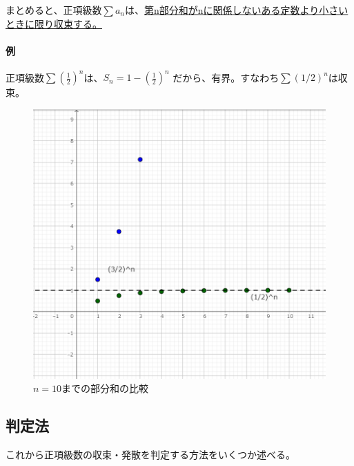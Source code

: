 \documentclass[a4j,dvipdfmx]{jsarticle}
\begin{document}
                まとめると、正項級数$\sum a_n$は、\underline{第n部分和がnに関係しないある定数より小さいときに限り収束する。}

                \paragraph{例}正項級数$\displaystyle \sum \left(\frac{1}{2}\right)^n$は、$\displaystyle S_n = 1-\left(\frac{1}{2}\right)^n$
                だから、有界。すなわち$\sum (1/2)^n$は収束。

                \begin{figure}[h]
                    \centering
                    \includegraphics[scale=0.5]{img/QuuNote/seikoukyusu.png}
                    \caption{$n=10$までの部分和の比較}
                \end{figure}
            \clearpage
            \subsection{判定法}
                これから正項級数の収束・発散を判定する方法をいくつか述べる。
\end{document}
